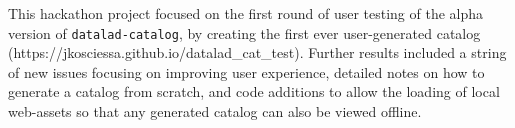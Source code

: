 \documentclass[../main.tex]{subfiles}
\begin{document}
This hackathon project focused on the first round of user testing of the alpha version of \texttt{datalad-catalog}, by creating the first ever user-generated catalog (https://jkosciessa.github.io/datalad_cat_test). Further results included a string of new issues focusing on improving user experience, detailed notes on how to generate a catalog from scratch, and code additions to allow the loading of local web-assets so that any generated catalog can also be viewed offline.
\end{document}
